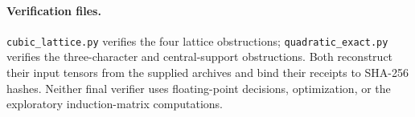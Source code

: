 \paragraph{Verification files.}
\nolinkurl{cubic_lattice.py} verifies the four lattice obstructions;
\nolinkurl{quadratic_exact.py} verifies the three-character and
central-support obstructions. Both reconstruct their input tensors
from the supplied archives and bind their receipts to SHA-256 hashes.
Neither final verifier uses floating-point decisions, optimization,
or the exploratory induction-matrix computations.
